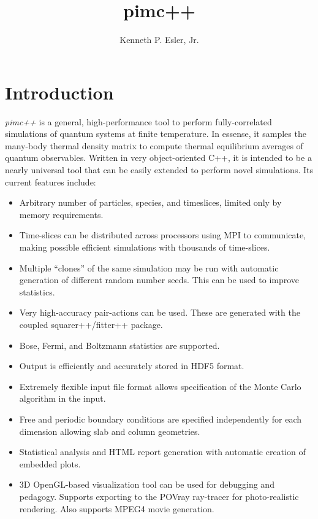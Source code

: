 \documentclass{book}
\author{Kenneth P. Esler, Jr.}
\title{pimc++}
\begin{document}
\maketitle
\chapter{Introduction}
{\em pimc++} is a general, high-performance tool to perform
fully-correlated simulations of quantum systems at finite temperature.
In essense, it samples the many-body thermal density matrix to compute
thermal equilibrium averages of quantum observables.  Written in very
object-oriented C++, it is intended to be a nearly universal tool that
can be easily extended to perform novel simulations.  Its current
features include:
\begin{itemize}
  \item Arbitrary number of particles, species, and timeslices,
        limited only by memory requirements.
  \item Time-slices can be distributed across processors using MPI to
        communicate, making possible efficient simulations with
        thousands of time-slices.
  \item Multiple ``clones'' of the same simulation may be run with
        automatic generation of different random number seeds.  This
        can be used to improve statistics.
  \item Very high-accuracy pair-actions can be used.  These are
        generated with the coupled squarer++/fitter++ package.
  \item Bose, Fermi, and Boltzmann statistics are supported.
  \item Output is efficiently and accurately stored in HDF5 format.
  \item Extremely flexible input file format allows specification of
        the Monte Carlo algorithm in the input.
  \item Free and periodic boundary conditions are specified
        independently for each dimension allowing slab and column
        geometries. 
  \item Statistical analysis and HTML report generation with
        automatic creation of embedded plots.
  \item 3D OpenGL-based visualization tool can be used for debugging
        and pedagogy.  Supports exporting to the POVray ray-tracer for 
        photo-realistic rendering.  Also supports MPEG4 movie generation.
\end{itemize}
\end{document}
